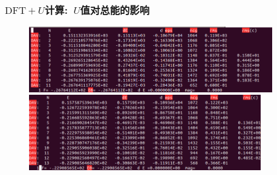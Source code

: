 \frame%
{
	\frametitle{$\mathrm{DFT}+U$计算:~$U$值对总能的影响}
\begin{figure}[h!]
	\vskip -13pt
\centering
\includegraphics[height=1.13in,viewport=6.5 0 836 235,clip]{Figures/NiO-LDA-OSZICAR.png}
\includegraphics[height=1.3in,viewport=0 0 830 270,clip]{Figures/NiO-LDA_U-OSZICAR.png}
\caption{\fontsize{6.2pt}{5.2pt}}%
\label{NiO-LDA_U-tot}
\end{figure}
{\fontsize{6.2pt}{5.2pt}}
}

